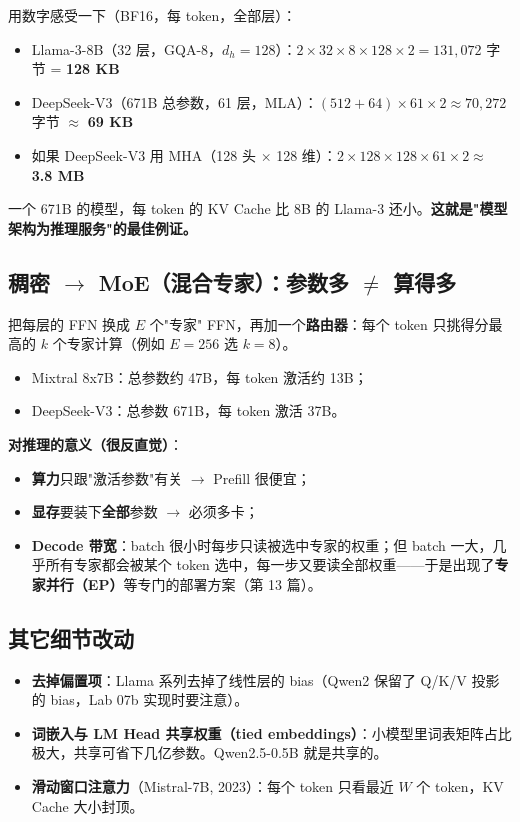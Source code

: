 用数字感受一下（BF16，每 token，全部层）：
\begin{itemize}
  \item Llama-3-8B（32 层，GQA-8，$d_h = 128$）：$2 \times 32 \times 8 \times 128 \times 2 = 131{,}072$ 字节 = \textbf{128 KB}
  \item DeepSeek-V3（671B 总参数，61 层，MLA）：$(512 + 64) \times 61 \times 2 \approx 70{,}272$ 字节 $\approx$ \textbf{69 KB}
  \item 如果 DeepSeek-V3 用 MHA（128 头 $\times$ 128 维）：$2 \times 128 \times 128 \times 61 \times 2 \approx$ \textbf{3.8 MB}
\end{itemize}

一个 671B 的模型，每 token 的 KV Cache 比 8B 的 Llama-3 还小。\textbf{这就是"模型架构为推理服务"的最佳例证。}

\subsection{稠密 \texorpdfstring{$\rightarrow$}{->} MoE（混合专家）：参数多 \texorpdfstring{$\neq$}{!=} 算得多}

把每层的 FFN 换成 $E$ 个"专家" FFN，再加一个\textbf{路由器}：每个 token 只挑得分最高的 $k$ 个专家计算（例如 $E = 256$ 选 $k = 8$）。
\begin{itemize}
  \item Mixtral 8x7B：总参数约 47B，每 token 激活约 13B；
  \item DeepSeek-V3：总参数 671B，每 token 激活 37B。
\end{itemize}

\textbf{对推理的意义（很反直觉）}：
\begin{itemize}
  \item \textbf{算力}只跟"激活参数"有关 $\rightarrow$ Prefill 很便宜；
  \item \textbf{显存}要装下\textbf{全部}参数 $\rightarrow$ 必须多卡；
  \item \textbf{Decode 带宽}：batch 很小时每步只读被选中专家的权重；但 batch 一大，几乎所有专家都会被某个 token 选中，每一步又要读全部权重——于是出现了\textbf{专家并行（EP）}等专门的部署方案（第 13 篇）。
\end{itemize}

\subsection{其它细节改动}

\begin{itemize}
  \item \textbf{去掉偏置项}：Llama 系列去掉了线性层的 bias（Qwen2 保留了 Q/K/V 投影的 bias，Lab 07b 实现时要注意）。
  \item \textbf{词嵌入与 LM Head 共享权重（tied embeddings）}：小模型里词表矩阵占比极大，共享可省下几亿参数。Qwen2.5-0.5B 就是共享的。
  \item \textbf{滑动窗口注意力}（Mistral-7B, 2023）：每个 token 只看最近 $W$ 个 token，KV Cache 大小封顶。
\end{itemize}

